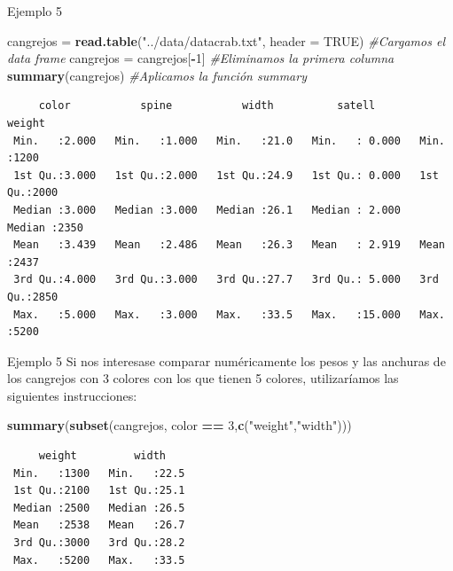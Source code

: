 \documentclass[
  ignorenonframetext,
  aspectratio=169]{beamer}
\newenvironment{Shaded}{\begin{snugshade}}{\end{snugshade}}
\newcommand{\AttributeTok}[1]{\textcolor[rgb]{0.13,0.29,0.53}{#1}}
\newcommand{\CommentTok}[1]{\textcolor[rgb]{0.56,0.35,0.01}{\textit{#1}}}
\newcommand{\ConstantTok}[1]{\textcolor[rgb]{0.56,0.35,0.01}{#1}}
\newcommand{\DecValTok}[1]{\textcolor[rgb]{0.00,0.00,0.81}{#1}}
\newcommand{\FunctionTok}[1]{\textcolor[rgb]{0.13,0.29,0.53}{\textbf{#1}}}
\newcommand{\NormalTok}[1]{#1}
\newcommand{\OtherTok}[1]{\textcolor[rgb]{0.56,0.35,0.01}{#1}}
\newcommand{\SpecialCharTok}[1]{\textcolor[rgb]{0.81,0.36,0.00}{\textbf{#1}}}
\newcommand{\StringTok}[1]{\textcolor[rgb]{0.31,0.60,0.02}{#1}}
\begin{document}
\begin{frame}[fragile]{Ejemplo 5}
\label{ejemplo-5-11}
\begin{Shaded}
\begin{Highlighting}[]
\NormalTok{cangrejos }\OtherTok{=} \FunctionTok{read.table}\NormalTok{(}\StringTok{"../data/datacrab.txt"}\NormalTok{, }\AttributeTok{header =} \ConstantTok{TRUE}\NormalTok{) }
\CommentTok{\#Cargamos el data frame}
\NormalTok{cangrejos }\OtherTok{=}\NormalTok{ cangrejos[}\SpecialCharTok{{-}}\DecValTok{1}\NormalTok{] }\CommentTok{\#Eliminamos la primera columna}
\FunctionTok{summary}\NormalTok{(cangrejos) }\CommentTok{\#Aplicamos la función summary}
\end{Highlighting}
\end{Shaded}

\begin{verbatim}
     color           spine           width          satell           weight    
 Min.   :2.000   Min.   :1.000   Min.   :21.0   Min.   : 0.000   Min.   :1200  
 1st Qu.:3.000   1st Qu.:2.000   1st Qu.:24.9   1st Qu.: 0.000   1st Qu.:2000  
 Median :3.000   Median :3.000   Median :26.1   Median : 2.000   Median :2350  
 Mean   :3.439   Mean   :2.486   Mean   :26.3   Mean   : 2.919   Mean   :2437  
 3rd Qu.:4.000   3rd Qu.:3.000   3rd Qu.:27.7   3rd Qu.: 5.000   3rd Qu.:2850  
 Max.   :5.000   Max.   :3.000   Max.   :33.5   Max.   :15.000   Max.   :5200  
\end{verbatim}
\end{frame}

\begin{frame}[fragile]{Ejemplo 5}
\label{ejemplo-5-12}
Si nos interesase comparar numéricamente los pesos y las anchuras de los
cangrejos con 3 colores con los que tienen 5 colores, utilizaríamos las
siguientes instrucciones:

\begin{Shaded}
\begin{Highlighting}[]
\FunctionTok{summary}\NormalTok{(}\FunctionTok{subset}\NormalTok{(cangrejos, color }\SpecialCharTok{==} \DecValTok{3}\NormalTok{,}\FunctionTok{c}\NormalTok{(}\StringTok{"weight"}\NormalTok{,}\StringTok{"width"}\NormalTok{)))}
\end{Highlighting}
\end{Shaded}

\begin{verbatim}
     weight         width     
 Min.   :1300   Min.   :22.5  
 1st Qu.:2100   1st Qu.:25.1  
 Median :2500   Median :26.5  
 Mean   :2538   Mean   :26.7  
 3rd Qu.:3000   3rd Qu.:28.2  
 Max.   :5200   Max.   :33.5  
\end{verbatim}
\end{frame}
\end{document}
